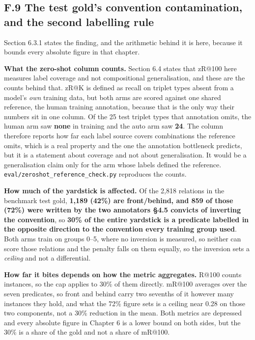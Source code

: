 \subsection{F.9 The test gold's convention contamination, and the second labelling rule}

Section 6.3.1 states the finding, and the arithmetic behind it is here, because it bounds every absolute figure in that chapter.

\textbf{What the zero-shot column counts.} Section 6.4 states that zR@100 here measures label coverage and not compositional generalisation, and these are the counts behind that. zR@K is defined as recall on triplet types absent from a model's \textit{own} training data, but both arms are scored against one shared reference, the human training annotation, because that is the only way their numbers sit in one column. Of the 25 test triplet types that annotation omits, the human arm saw \textbf{none} in training and the auto arm saw \textbf{24}. The column therefore reports how far each label source covers combinations the reference omits, which is a real property and the one the annotation bottleneck predicts, but it is a statement about coverage and not about generalisation. It would be a generalisation claim only for the arm whose labels defined the reference. \texttt{eval/zeroshot\_\allowbreak{}reference\_\allowbreak{}check.py} reproduces the counts.

\textbf{How much of the yardstick is affected.} Of the 2,818 relations in the benchmark test gold, \textbf{1,189 (42\%) are front/behind, and 859 of those (72\%) were written by the two annotators \S{}4.5 convicts of inverting the convention}, so \textbf{30\% of the entire yardstick is a predicate labelled in the opposite direction to the convention every training group used}. Both arms train on groups 0--5, where no inversion is measured, so neither can score those relations and the penalty falls on them equally, so the inversion sets a \textit{ceiling} and not a differential.

\textbf{How far it bites depends on how the metric aggregates.} R@100 counts instances, so the cap applies to 30\% of them directly. mR@100 averages over the seven predicates, so front and behind carry two sevenths of it however many instances they hold, and what the 72\% figure sets is a ceiling near 0.28 on those two components, not a 30\% reduction in the mean. Both metrics are depressed and every absolute figure in Chapter 6 is a lower bound on both sides, but the 30\% is a share of the gold and not a share of mR@100.

